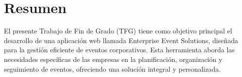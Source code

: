 \documentclass[12pt,twoside,titlepage]{report}
\newcommand{\nombreautor}{Carlos Fernández López}
\newcommand{\nombretutor}{Michel Maes Bermejo}
\newcommand{\titulotrabajo}{Enterprise Event Solutions}
\newcommand{\escuelalargo}{Escuela Técnica Superior de Ingeniería Informática}
\newcommand{\universidad}{Universidad Rey Juan Carlos}
\newcommand{\fecha}{Fecha}
\newcommand\blankpage{%
    \newpage
    \null
    \thispagestyle{empty}%
    \newpage}
\begin{document}








\hypersetup{pageanchor=true}

\normalsize
\afterpage{\blankpage} %






\setlength{\parskip}{0.75em}
\renewcommand{\baselinestretch}{1.5}

\setcounter{page}{2}




\chapter*{Resumen}

El presente Trabajo de Fin de Grado (TFG) tiene como objetivo principal el desarrollo de una aplicación web llamada Enterprise Event Solutions, diseñada para 
la gestión eficiente de eventos corporativos. Esta herramienta aborda las necesidades específicas de las empresas en la planificación, organización y seguimiento 
de eventos, ofreciendo una solución integral y personalizada.
\end{document}
